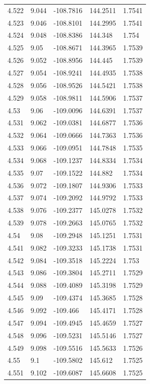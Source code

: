 \begin{tabular}{lllll}
4.522 & 9.044 & -108.7816 & 144.2511 & 1.7541 \\
4.523 & 9.046 & -108.8101 & 144.2995 & 1.7541 \\
4.524 & 9.048 & -108.8386 & 144.348 & 1.754 \\
4.525 & 9.05 & -108.8671 & 144.3965 & 1.7539 \\
4.526 & 9.052 & -108.8956 & 144.445 & 1.7539 \\
4.527 & 9.054 & -108.9241 & 144.4935 & 1.7538 \\
4.528 & 9.056 & -108.9526 & 144.5421 & 1.7538 \\
4.529 & 9.058 & -108.9811 & 144.5906 & 1.7537 \\
4.53 & 9.06 & -109.0096 & 144.6391 & 1.7537 \\
4.531 & 9.062 & -109.0381 & 144.6877 & 1.7536 \\
4.532 & 9.064 & -109.0666 & 144.7363 & 1.7536 \\
4.533 & 9.066 & -109.0951 & 144.7848 & 1.7535 \\
4.534 & 9.068 & -109.1237 & 144.8334 & 1.7534 \\
4.535 & 9.07 & -109.1522 & 144.882 & 1.7534 \\
4.536 & 9.072 & -109.1807 & 144.9306 & 1.7533 \\
4.537 & 9.074 & -109.2092 & 144.9792 & 1.7533 \\
4.538 & 9.076 & -109.2377 & 145.0278 & 1.7532 \\
4.539 & 9.078 & -109.2663 & 145.0765 & 1.7532 \\
4.54 & 9.08 & -109.2948 & 145.1251 & 1.7531 \\
4.541 & 9.082 & -109.3233 & 145.1738 & 1.7531 \\
4.542 & 9.084 & -109.3518 & 145.2224 & 1.753 \\
4.543 & 9.086 & -109.3804 & 145.2711 & 1.7529 \\
4.544 & 9.088 & -109.4089 & 145.3198 & 1.7529 \\
4.545 & 9.09 & -109.4374 & 145.3685 & 1.7528 \\
4.546 & 9.092 & -109.466 & 145.4171 & 1.7528 \\
4.547 & 9.094 & -109.4945 & 145.4659 & 1.7527 \\
4.548 & 9.096 & -109.5231 & 145.5146 & 1.7527 \\
4.549 & 9.098 & -109.5516 & 145.5633 & 1.7526 \\
4.55 & 9.1 & -109.5802 & 145.612 & 1.7525 \\
4.551 & 9.102 & -109.6087 & 145.6608 & 1.7525 \\

\end{tabular}
